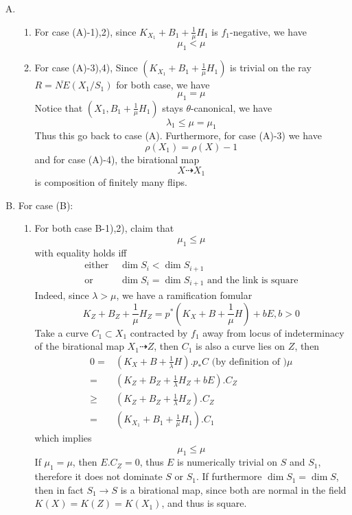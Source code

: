 \documentclass{article}
\begin{document}
\begin{enumerate}[(A)]
\item 
\begin{enumerate}[1)]
\item For case (A)-1),2),  since $ K_{X_1}+B_1+\frac{1}{\mu}H_1 $ is $ f_1 $-negative, we have 
$$ \mu_1<\mu $$
\item For case (A)-3),4), Since $ (K_{X_1}+B_1+\frac{1}{\mu}H_1) $ is trivial on the ray $ R=\overline{NE}(X_1/S_1) $ for both case, we have
$$ \mu_1=\mu $$
Notice that $ (X_1,B_1+\frac{1}{\mu}H_1) $ stays $ \theta $-canonical, we have
$$ \lambda_1\leqslant \mu=\mu_1 $$
Thus this go back to case (A). Furthermore,   for case (A)-3) we have
$$ \rho(X_1)=\rho(X)-1 $$
and for case (A)-4), the birational map
$$ X\dashrightarrow X_1 $$
is composition of finitely many flips.
\end{enumerate}	
\item For case (B): 
\begin{enumerate}[1)]
\item For both case B-1),2), claim that 
$$ \mu_1\leqslant \mu $$
with equality holds iff 
\begin{equation*}
\begin{aligned}
\text{either } &\dim S_i<\dim S_{i+1} \\
\text{or }&\dim S_i=\dim S_{i+1} \text{ and the link is square} 
\end{aligned}
\end{equation*} 
Indeed, since $ \lambda>\mu $, we have a ramification fomular
$$ K_Z+B_Z+\frac{1}{\mu}H_Z=p^*(K_X+B+\frac{1}{\mu}H)+bE, b>0 $$
Take a curve $ C_1\subset X_1 $ contracted by $ f_1 $ away from locus of indeterminacy of the birational map $ X_1\dashrightarrow Z $, then $ C_1 $ is also a curve lies on $ Z $, then
\begin{equation*}
\begin{aligned}
0=& (K_{X}+B+\frac{1}{\lambda}H).p_*C \text{ (by definition of )} \mu\\
=&(K_{Z}+B_{Z}+\frac{1}{\lambda}H_Z+bE).C_{Z}\\
\geqslant&(K_Z+B_Z+\frac{1}{\lambda}H_Z).C_Z\\
=&(K_{X_1}+B_1+\frac{1}{\mu}H_1).C_1
\end{aligned}
\end{equation*} 
which implies 
$$ \mu_1\leqslant \mu $$
If $ \mu_1=\mu $, then $ E.C_Z=0 $, thus $ E $ is numerically trivial on $ S $ and $ S_1 $, therefore it  does not dominate $ S $ or $ S_1 $. If furthermore $ \dim S_1=\dim S $, then in fact $  S_1\to S  $ is a birational map, since both are normal in the field $ K(X)=K(Z)=K(X_1) $, and thus is square.

\end{enumerate}
\end{enumerate}
\end{document}
